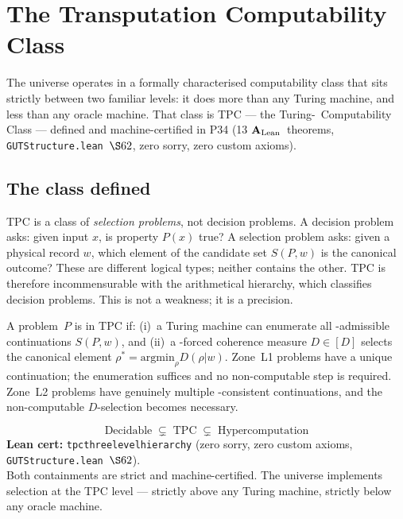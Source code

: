 \documentclass[11pt,openany]{book}
\theoremstyle{remark}
\newcommand{\PSC}{\text{PSC}}
\newcommand{\lean}[1]{%
  \penalty-100
  \begingroup\def\_{\textunderscore\allowbreak}\texttt{#1}\endgroup}
\newcommand{\CatAL}{\ensuremath{\textbf{A}_{\rm Lean}}}
\begin{document}
\section{The Transputation Computability Class}
\label{sec:tpc}

The universe operates in a formally characterised computability class that sits
strictly between two familiar levels: it does more than any Turing machine, and
less than any oracle machine. That class is TPC --- the Turing-\PSC\ Computability
Class --- defined and machine-certified in P34 (13 \CatAL\ theorems,
\texttt{GUTStructure.lean}~$\S62$, zero sorry, zero custom axioms).

\subsection*{The class defined}

TPC is a class of \emph{selection problems}, not decision problems. A decision
problem asks: given input $x$, is property $P(x)$ true? A selection problem asks:
given a physical record $w$, which element of the candidate set $S(P,w)$ is the
canonical outcome? These are different logical types; neither contains the other.
TPC is therefore incommensurable with the arithmetical hierarchy, which classifies
decision problems. This is not a weakness; it is a precision.

A problem~$P$ is in TPC if: (i)~a Turing machine can enumerate all
\PSC-admissible continuations $S(P,w)$, and (ii)~a \PSC-forced coherence
measure $D \in [D]$ selects the canonical element
$\rho^* = \mathrm{argmin}_\rho D(\rho|w)$. Zone~L1 problems have a unique
continuation; the enumeration suffices and no non-computable step is required.
Zone~L2 problems have genuinely multiple \PSC-consistent continuations, and the
non-computable $D$-selection becomes necessary.

\begin{tcolorbox}[colback=orange!5,colframe=orange!60,
  title={TPC Three-Level Hierarchy (\CatAL)}]
\[
  \text{Decidable} \;\subsetneq\; \text{TPC} \;\subsetneq\; \text{Hypercomputation}
\]
\textbf{Lean cert:} \lean{tpc\_three\_level\_hierarchy} (zero sorry, zero custom axioms, \texttt{GUTStructure.lean}~$\S62$).\\[0.4em]
Both containments are strict and machine-certified. The universe implements
selection at the TPC level --- strictly above any Turing machine, strictly
below any oracle machine.
\end{tcolorbox}
\end{document}
